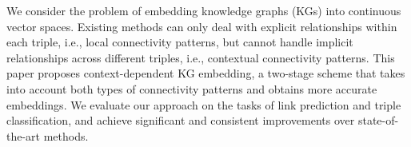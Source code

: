 We consider the problem of embedding knowledge graphs (KGs) into continuous vector spaces. Existing methods can only deal with explicit relationships within each triple, i.e., local connectivity patterns, but cannot handle implicit relationships across different triples, i.e., contextual connectivity patterns. This paper proposes context-dependent KG embedding, a two-stage scheme that takes into account both types of connectivity patterns and obtains more accurate embeddings. We evaluate our approach on the tasks of link prediction and triple classification, and achieve significant and consistent improvements over state-of-the-art methods.
